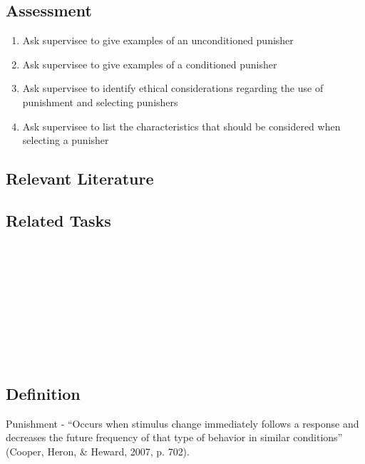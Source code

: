 \subsection{Assessment}
\begin{enumerate}
\item Ask supervisee to give examples of an unconditioned punisher
\item Ask supervisee to give examples of a conditioned  punisher
\item Ask supervisee to identify ethical considerations regarding the use of punishment and selecting punishers 
\item Ask supervisee to list the characteristics that should be considered when selecting a punisher 
\end{enumerate}
%
\subsection{Relevant Literature}
\begin{refsection}
\nocite{azrin1966punishment,
        bac2014professional,
        cooper2007applied,
        fisher1994preliminary,
        iwata1988development,
        lerman2002status,
        luiselli2008effective,
        thompson1999effects,
        vorndran2006establishing}
\printbibliography[heading=none]
\end{refsection}
\subsection{Related Tasks}
\fourdSixteen{}\\
\fourdSeventeen{}\\
\fourjTwo{}\\
\fourjTen{}\\
\fourFKNineteen{}\\
\fourFKTwenty{}\\
\fourFKTwentyOne{}\\
\fourFKTwentyThree{}\\
%
%
%
%
%
%
%
%
%
%
%
\section{\fourdSixteen{}}
\subsection{Definition}
Punishment - ``Occurs when stimulus change immediately follows a response and decreases the future frequency of that type of behavior in similar conditions'' (Cooper, Heron, \& Heward, 2007, p. 702).

